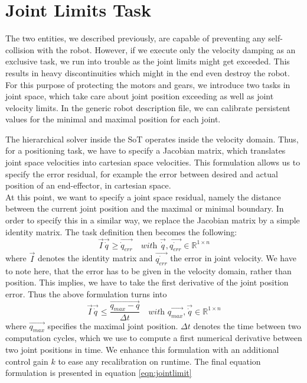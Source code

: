 \section{Joint Limits Task}
The two entities, we described previously, are capable of preventing any self-collision with the robot. However, if we execute only the velocity damping as an exclusive task, we run into trouble as the joint limits might get exceeded. This results in heavy discontinuities which might in the end even destroy the robot. For this purpose of protecting the motors and gears, we introduce two tasks in joint space, which take care about joint position exceeding as well as joint velocity limits. In the generic robot description file, we can calibrate persistent values for the minimal and maximal position for each joint. 

The hierarchical solver inside the SoT operates inside the velocity domain. Thus, for a positioning task, we have to specify a Jacobian matrix, which translates joint space velocities into cartesian space velocities. This formulation allows us to specify the error residual, for example the error between desired and actual position of an end-effector, in cartesian space. \\
At this point, we want to specify a joint space residual, namely the distance between the current joint position and the maximal or minimal boundary. In order to specify this in a similar way, we replace the Jacobian matrix by a simple identity matrix. The task definition then becomes the following:
\begin{equation}
\vec{I} \vec{\dot{q}} \geq \vec{\dot{q}_{err}} \quad \textit{with } \vec{\dot{q}},\vec{\dot{q_{err}}} \in \mathbb{R}^{1\times n}
\end{equation}
where $\vec{I}$ denotes the identity matrix and $\vec{\dot{q_{err}}}$ the error in joint velocity. We have to note here, that the error has to be given in the velocity domain, rather than position. This implies, we have to take the first derivative of the joint position error. Thus the above formulation turns into
\begin{equation}
\vec{I} \vec{\dot{q}} \leq \frac{\vec{q_{max}-q}}{\Delta t} \quad \textit{with } \vec{q_{max}},\vec{\dot{q}} \in \mathbb{R}^{1\times n}
\end{equation}
where $\vec{q_{max}}$ specifies the maximal joint position. $\Delta t$ denotes the time between two computation cycles, which we use to compute a first numerical derivative between two joint positions in time. We enhance this formulation with an additional control gain $k$ to ease any recalibration on runtime. The final equation formulation is presented in equation \ref{eqn:jointlimit}
